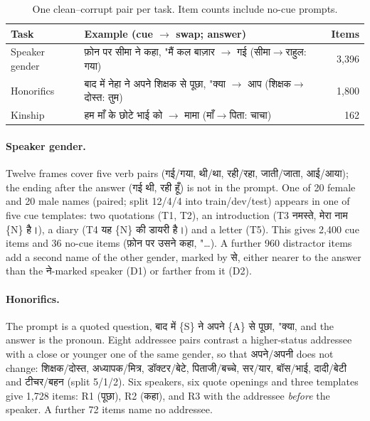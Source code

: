 \documentclass[11pt]{article}
\newcommand{\hi}[1]{{\devfont #1}}
\newcommand{\slot}[1]{{\normalfont\{#1\}}}  %
\newcommand{\aap}{\hi{आप}}
\newcommand{\tum}{\hi{तुम}}
\begin{document}
\begin{table}[t]
\centering\small
\setlength{\tabcolsep}{3pt}
\begin{tabular}{>{\raggedright\arraybackslash}p{1.35cm}>{\raggedright\arraybackslash}p{3.85cm}r}
\toprule
Task & Example (cue $\to$ swap; answer) & Items \\
\midrule
Speaker gender & \hi{फ़ोन पर सीमा ने कहा, "मैं कल बाज़ार} $\to$ \hi{गई} (\hi{सीमा}$\to$\hi{राहुल}: \hi{गया}) & 3,396 \\
Honorifics & \hi{बाद में नेहा ने अपने शिक्षक से पूछा, "क्या} $\to$ \aap{} (\hi{शिक्षक}$\to$\hi{दोस्त}: \tum{}) & 1,800 \\
Kinship & \hi{हम माँ के छोटे भाई को} $\to$ \hi{मामा} (\hi{माँ}$\to$\hi{पिता}: \hi{चाचा}) & 162 \\
\bottomrule
\end{tabular}
\caption{One clean--corrupt pair per task. Item counts include no-cue prompts.}
\label{tab:data}
\end{table}

\paragraph{Speaker gender.} Twelve frames cover five verb pairs (\hi{गई/गया}, \hi{थी/था}, \hi{रही/रहा}, \hi{जाती/जाता}, \hi{आई/आया}); the ending after the answer (\hi{गई थी}, \hi{रही हूँ}) is not in the prompt. One of 20 female and 20 male names (paired; split 12/4/4 into train/dev/test) appears in one of five cue templates: two quotations (T1, T2), an introduction (T3 \hi{नमस्ते, मेरा नाम \slot{N} है।}), a diary (T4 \hi{यह \slot{N} की डायरी है।}) and a letter (T5). This gives 2,400 cue items and 36 no-cue items (\hi{फ़ोन पर उसने कहा, "}\ldots). A further 960 distractor items add a second name of the other gender, marked by \hi{से}, either nearer to the answer than the \hi{ने}-marked speaker (D1) or farther from it (D2).

\paragraph{Honorifics.} The prompt is a quoted question, \hi{बाद में \slot{S} ने अपने \slot{A} से पूछा, "क्या}, and the answer is the pronoun. Eight addressee pairs contrast a higher-status addressee with a close or younger one of the same gender, so that \hi{अपने/अपनी} does not change: \hi{शिक्षक/दोस्त}, \hi{अध्यापक/मित्र}, \hi{डॉक्टर/बेटे}, \hi{पिताजी/बच्चे}, \hi{सर/यार}, \hi{बॉस/भाई}, \hi{दादी/बेटी} and \hi{टीचर/बहन} (split 5/1/2). Six speakers, six quote openings and three templates give 1,728 items: R1 (\hi{पूछा}), R2 (\hi{कहा}), and R3 with the addressee \emph{before} the speaker. A further 72 items name no addressee.
\end{document}
